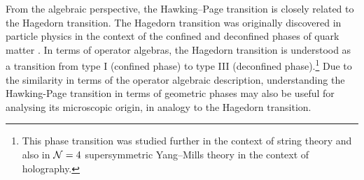 \documentclass[a4paper,11pt]{article}
\newcommand{\1}{\mathds{1}}
\begin{document}
From the algebraic perspective, the Hawking--Page transition is closely related to the Hagedorn transition. The Hagedorn transition was originally discovered in particle physics in the context of the confined and deconfined phases of quark matter \cite{Hagedorn:1965st}. In terms of operator algebras, the Hagedorn transition is understood as a transition from type I (confined phase) to type III (deconfined phase).\footnote{This phase transition was studied further in the context of string theory \cite{Atick:1988si} and also in ${\cal N}=4$ supersymmetric Yang--Mills theory \cite{Witten:1998zw,Sundborg:1999ue} in the context of holography.} Due to the similarity in terms of the operator algebraic description, understanding the Hawking-Page transition in terms of geometric phases may also be useful for analysing its microscopic origin, in analogy to the Hagedorn transition.
\end{document}

